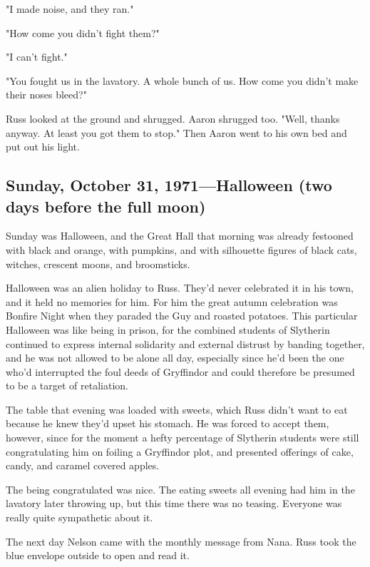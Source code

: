 "I made{\el} noise, and they{\el} ran."

"How come you didn't fight them?"

"I can't{\el} fight."

"You fought us in the lavatory. A whole bunch of us. How come you didn't make their noses bleed?"

Russ looked at the ground and shrugged. Aaron shrugged too. "Well, thanks anyway. At least you got them to stop." Then Aaron went to his own bed and put out his light.

\subsection{Sunday, October 31, 1971—Halloween (two days before the full moon)}

Sunday was Halloween, and the Great Hall that morning was already festooned with black and orange, with pumpkins, and with silhouette figures of black cats, witches, crescent moons, and broomsticks.

Halloween was an alien holiday to Russ. They'd never celebrated it in his town, and it held no memories for him. For him the great autumn celebration was Bonfire Night when they paraded the Guy and roasted potatoes. This particular Halloween was like being in prison, for the combined students of Slytherin continued to express internal solidarity and external distrust by banding together, and he was not allowed to be alone all day, especially since he'd been the one who'd interrupted the foul deeds of Gryffindor and could therefore be presumed to be a target of retaliation.

The table that evening was loaded with sweets, which Russ didn't want to eat because he knew they'd upset his stomach. He was forced to accept them, however, since for the moment a hefty percentage of Slytherin students were still congratulating him on foiling a Gryffindor plot, and presented offerings of cake, candy, and caramel covered apples.

The being congratulated was nice. The eating sweets all evening had him in the lavatory later throwing up, but this time there was no teasing. Everyone was really quite sympathetic about it.

The next day Nelson came with the monthly message from Nana. Russ took the blue envelope outside to open and read it.

